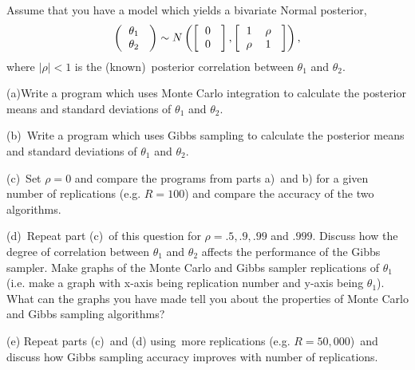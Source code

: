 \documentclass{article}
\begin{document}
Assume that you have a model which yields a bivariate Normal posterior,%
\begin{equation*}
\left( 
\begin{tabular}{c}
$\theta _{1}$ \\ 
$\theta _{2}$%
\end{tabular}%
\ \right) \sim N\left( \left[ 
\begin{tabular}{c}
$0$ \\ 
$0$%
\end{tabular}%
\ \right] ,\left[ 
\begin{tabular}{cc}
$1$ & $\rho $ \\ 
$\rho $ & $1$%
\end{tabular}%
\ \right] \right) ,
\end{equation*}%
where $|\rho |<1$ is the (known)\ posterior correlation between $\theta _{1}$
and $\theta _{2}$.

(a)Write a program which uses Monte Carlo integration to calculate the
posterior means and standard deviations of $\theta _{1}$ and $\theta _{2}$.

(b)\ Write a program which uses Gibbs sampling to calculate the posterior
means and standard deviations of $\theta _{1}$ and $\theta _{2}$.

(c)\ Set $\rho =0$ and compare the programs from parts a)\ and b) for a
given number of replications (e.g. $R=100$) and compare the accuracy of the
two algorithms.

(d)\ Repeat part (c)\ of this question for $\rho =.5,.9,.99$ and $.999$.
Discuss how the degree of correlation between $\theta _{1}$ and $\theta _{2}$
affects the performance of the Gibbs sampler. Make graphs of the Monte Carlo
and Gibbs sampler replications of $\theta _{1}$ (i.e. make a graph with
x-axis being replication number and y-axis being $\theta _{1}$). What can
the graphs you have made tell you about the properties of Monte Carlo and
Gibbs sampling algorithms?

(e) Repeat parts (c)\ and (d) using\ more replications (e.g. $R=50,000$)\
and discuss how Gibbs sampling accuracy improves with number of replications.
\end{document}
